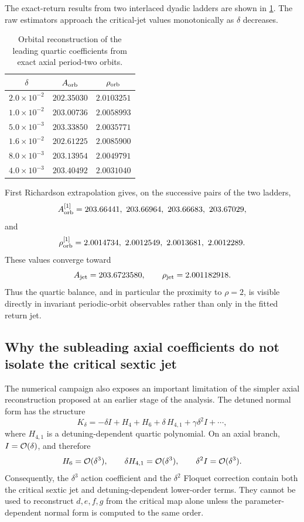 The exact-return results from two interlaced dyadic ladders are shown in \cref{tab:orbital-quartic}.  The raw estimators approach the critical-jet values monotonically as $\delta$ decreases.

\begin{table}[t]
\centering
\caption{Orbital reconstruction of the leading quartic coefficients from exact axial period-two orbits.}
\label{tab:orbital-quartic}
\begin{tabular}{ccc}
\toprule
$\delta$ & $A_{\rm orb}$ & $\rho_{\rm orb}$ \\
\midrule
$2.0\times10^{-2}$ & $202.35030$ & $2.0103251$ \\
$1.0\times10^{-2}$ & $203.00736$ & $2.0058993$ \\
$5.0\times10^{-3}$ & $203.33850$ & $2.0035771$ \\
$1.6\times10^{-2}$ & $202.61225$ & $2.0085900$ \\
$8.0\times10^{-3}$ & $203.13954$ & $2.0049791$ \\
$4.0\times10^{-3}$ & $203.40492$ & $2.0031040$ \\
\bottomrule
\end{tabular}
\end{table}

First Richardson extrapolation gives, on the successive pairs of the two ladders,
\[
A_{\rm orb}^{[1]}
=203.66441,
\ 203.66964,
\ 203.66683,
\ 203.67029,
\]
and
\[
\rho_{\rm orb}^{[1]}
=2.0014734,
\ 2.0012549,
\ 2.0013681,
\ 2.0012289.
\]
These values converge toward
\[
A_{\rm jet}=203.6723580,
\qquad
\rho_{\rm jet}=2.001182918.
\]
Thus the quartic balance, and in particular the proximity to $\rho=2$, is visible directly in invariant periodic-orbit observables rather than only in the fitted return jet.

\subsection{Why the subleading axial coefficients do not isolate the critical sextic jet}
\label{sec:axial-contamination}

The numerical campaign also exposes an important limitation of the simpler axial reconstruction proposed at an earlier stage of the analysis.  The detuned normal form has the structure
\begin{equation}
K_\delta
=
-\delta I
+H_4
+H_6
+\delta\,H_{4,1}
+\gamma\delta^2 I
+\cdots,
\label{eq:detuned-extended}
\end{equation}
where $H_{4,1}$ is a detuning-dependent quartic polynomial.  On an axial branch, $I=\mathcal{O}(\delta)$, and therefore
\[
H_6=\mathcal{O}(\delta^3),
\qquad
\delta H_{4,1}=\mathcal{O}(\delta^3),
\qquad
\delta^2 I=\mathcal{O}(\delta^3).
\]
Consequently, the $\delta^3$ action coefficient and the $\delta^2$ Floquet correction contain both the critical sextic jet and detuning-dependent lower-order terms.  They cannot be used to reconstruct $d,e,f,g$ from the critical map alone unless the parameter-dependent normal form is computed to the same order.

